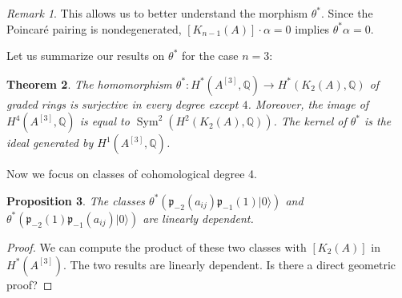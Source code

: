 \documentclass{amsart}
\DeclareMathOperator{\Sym}{Sym}
\newcommand{\hilb}[1]{^{[#1]}}
\newcommand{\vac}{|0\rangle}
\newcommand{\p}{\mathfrak{p}}
\newcommand{\pone}{ \mathfrak{p}_{ - 1} }
\newcommand{\kum}[2]{K_{ #2 }( #1 )}
\newcommand{\Q}{\mathbb{Q}}
\theoremstyle{plain}
\newtheorem{theorem}{Theorem}[section]
\newtheorem{proposition}[theorem]{Proposition}
\theoremstyle{definition}
\theoremstyle{remark}
\newtheorem{remark}[theorem]{Remark}
\begin{document}
\begin{remark}
This allows us to better understand the morphism $\theta^*$. Since the Poincar\'e pairing is nondegenerated, $[\kum{A}{n-1}]\cdot \alpha=0$ implies $\theta^* \alpha =0$.
\end{remark}
Let us summarize our results on $\theta^*$ for the case $n=3$:
\begin{theorem}
The homomorphism $\theta^* : H^*(A\hilb{3},\Q)\rightarrow H^*(\kum{A}{2},\Q)$ of graded rings is surjective in every degree except $4$. Moreover, the image of $H^4(A\hilb{3},\Q)$ is equal to $\Sym^2(H^2(\kum{A}{2},\Q))$. 
The kernel of $\theta^*$ is the ideal generated by $H^1(A\hilb{3},\Q)$.
\end{theorem}


Now we focus on classes of cohomological degree 4.
\begin{proposition}
The classes $\theta^* \left(\p_{-2}(a_{ij})\pone(1)\vac\right) $ and $\theta^*\left( \p_{-2}(1)\pone(a_{ij})\vac\right) $ are linearly dependent.
\end{proposition}
\begin{proof}
We can compute the product of these two classes with $[ \kum{A}{2} ] $ in $H^*(A\hilb{3})$. The two results are linearly dependent. Is there a direct geometric proof?
\end{proof}
\end{document}
